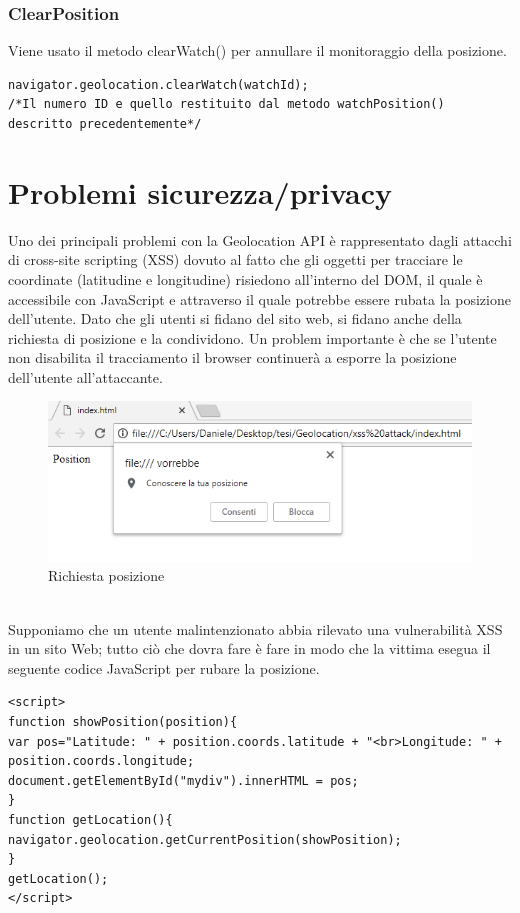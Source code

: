 \documentclass[11pt ,a4paper , twoside , openright ]{article}
\begin{document}
\subsubsection{ClearPosition}
Viene usato il metodo clearWatch() per annullare il monitoraggio della posizione.
\begin{lstlisting}
navigator.geolocation.clearWatch(watchId);
/*Il numero ID e quello restituito dal metodo watchPosition() descritto precedentemente*/
\end{lstlisting}
\newpage
\section{Problemi sicurezza/privacy}
Uno dei principali problemi con la Geolocation API è rappresentato dagli attacchi di cross-site scripting (XSS) dovuto al fatto che gli oggetti per tracciare le coordinate (latitudine e longitudine) risiedono all'interno del DOM, il quale è accessibile con JavaScript e attraverso il quale potrebbe essere rubata la posizione dell'utente. 
Dato che gli utenti si fidano del sito web, si fidano anche della richiesta di posizione e la condividono.
Un problem importante è che se l'utente non disabilita il tracciamento il browser continuerà a esporre la posizione dell'utente all'attaccante.
\begin{figure}[h]
	\centering
	\includegraphics[width=1\linewidth]{pos1}
	\caption{Richiesta posizione}
	\label{fig: Richiesta posizione}
\end{figure}
\\
Supponiamo che un utente malintenzionato abbia rilevato una vulnerabilità XSS in un sito Web; tutto ciò che dovra fare è fare in modo che la vittima esegua il seguente codice JavaScript per rubare la posizione.
\begin{lstlisting}
<script>
function showPosition(position){
var pos="Latitude: " + position.coords.latitude + "<br>Longitude: " + position.coords.longitude;
document.getElementById("mydiv").innerHTML = pos;
}
function getLocation(){
navigator.geolocation.getCurrentPosition(showPosition);
}
getLocation();
</script>
\end{lstlisting}
\end{document}
